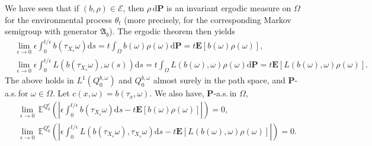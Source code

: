 \documentclass[11pt,reqno]{amsart}
\theoremstyle{definition}
\theoremstyle{remark}
\numberwithin{equation}{section}
\def\bP{\mathbf{P}}
\begin{document}
We have seen that if $(b,\rho) \in \mathscr{E}$, then $\rho\,\mathrm{d}\mathbf{P}$ is an invariant ergodic measure on $\Omega$ for the environmental process $\theta_t$ (more precisely, for the corresponding Markov semigroup with generator $\mathfrak{A}_b$). The ergodic theorem then yields
\begin{equation*}
\begin{aligned}
    &\lim_{\epsilon\rightarrow 0} \epsilon \int^{t/\epsilon}_{0} b(\tau_{X_{s}}\omega) \mathrm{d}s = t\int_\Omega b(\omega)\rho(\omega)\mathrm{d}\bP = t\mathbf{E}[b(\omega)\rho(\omega)],\\%
    &\lim_{\epsilon\rightarrow 0} \epsilon \int^{t/\epsilon}_{0} L(b(\tau_{X_{s}}\omega),\omega(s))\mathrm{d}s = t\int_\Omega L(b(\omega),\omega)\rho(\omega)\mathrm{d}\bP = t\mathbf{E}[L(b(\omega),\omega)\rho(\omega)].%
    \end{aligned}
\end{equation*}
The above holds in $L^{1}(Q^{b,\omega}_{0})$ and $Q^{b,\omega}_0$ almost surely in the path space, and $\bP$-a.s.\,for $\omega \in \Omega$. Let $c(x,\omega)=b(\tau_x,\omega)$. %
We also have, $\bP$-a.s.\,in $\Omega$,
\begin{equation}
    \label{eq:Qcergodic-1}
\begin{aligned}
     &\lim_{\epsilon\rightarrow 0}\, \mathbb{E}^{Q^{c}_{0}}\left(\left|\epsilon\int^{t/\epsilon}_{0}b(\tau_{X_{s}}\omega)\mathrm{d}s - t\mathbf{E}[b(\omega)\rho(\omega)] \right| \right)= 0,\\
    &\lim_{\epsilon\rightarrow 0}\, \mathbb{E}^{Q^{c}_{0}}\left(\left|\epsilon\int^{t/\epsilon}_{0}L(b(\tau_{X_{s}}\omega),\tau_{X_{s}}\omega)\mathrm{d}s - t\mathbf{E}[L(b(\omega),\omega)\rho(\omega)] \right| \right) =  0.
\end{aligned}
\end{equation}
\end{document}
